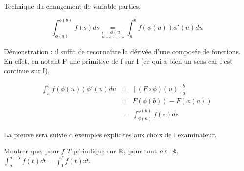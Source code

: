 \documentclass{article}
\begin{document}
\begin{question_kholle}{Technique du changement de variable parties.}
	
$$
\int_{\phi(a)}^{\phi(b)} f(s)ds \underset{\underset{ds = \phi'(u)du}{s = \phi(u)}}{=} \int_{a}^{b} f(\phi(u))\phi'(u)du
$$

Démonstration : il suffit de reconnaître la dérivée d'une composée de fonctions.
En effet, en notant F une primitive de f sur I (ce qui a bien un sens car f est continue sur I),

\begin{eqnarray*}
	\int_{a}^{b} f(\phi(u))\phi'(u)du &=&
	\left[ (F \circ \phi)(u)\right]_{a}^{b} \\ &=& 
	F(\phi(b)) - F(\phi(a)) \\ 
	&=& \int_{\phi(a)}^{\phi(b)} f(s)ds
\end{eqnarray*}


La preuve sera suivie d'exemples explicites aux choix de l'examinateur.

	
\end{question_kholle}

\begin{question_kholle}{Montrer que, pour $f$ $T$-périodique sur $\mathbb R$, pour tout $a\in\mathbb R$, $\displaystyle\int_{a}^{a+T}f(t)\dd t = \int_{0}^{T}f(t)\dd t$.}
\end{question_kholle}
\end{document}

